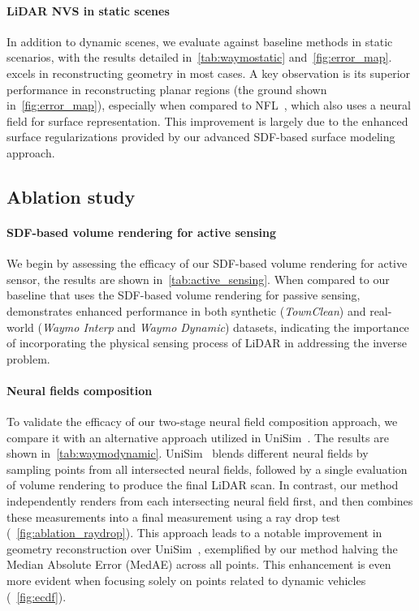 
\paragraph{LiDAR NVS in static scenes}
In addition to dynamic scenes, we evaluate \dynfl against baseline methods in static scenarios, with the results detailed in~\cref{tab:waymostatic} and~\cref{fig:error_map}. \dynfl excels in reconstructing geometry in most cases. A key observation is its superior performance in reconstructing planar regions (\eg the ground shown in~\cref{fig:error_map}), especially when compared to NFL~\cite{Huang2023nfl}, which also uses a neural field for surface representation. This improvement is largely due to the enhanced surface regularizations provided by our advanced SDF-based surface modeling approach.













\subsection{Ablation study}
\paragraph{SDF-based volume rendering for active sensing}
We begin by assessing the efficacy of our SDF-based volume rendering for active sensor, the results are shown in~\cref{tab:active_sensing}. When compared to our baseline that uses the SDF-based volume rendering for passive sensing, \dynfl demonstrates enhanced performance in both synthetic (\textit{TownClean}) and real-world (\textit{Waymo Interp} and \textit{Waymo Dynamic}) datasets, indicating the importance of incorporating the physical sensing process of LiDAR in addressing the inverse problem.


\paragraph{Neural fields composition} 
To validate the efficacy of our two-stage neural field composition approach, we compare it with an alternative approach utilized in UniSim~\cite{yang2023unisim}. The results are shown in~\cref{tab:waymodynamic}. UniSim~\cite{yang2023unisim} blends different neural fields by sampling points from all intersected neural fields, followed by a single evaluation of volume rendering to produce the final LiDAR scan. In contrast, our method independently renders from each intersecting neural field first, and then combines these measurements into a final measurement using a ray drop test (\cf~\cref{fig:ablation_raydrop}). This approach leads to a notable improvement in geometry reconstruction over UniSim~\cite{yang2023unisim}, exemplified by our method halving the Median Absolute Error (MedAE) across all points. This enhancement is even more evident when focusing solely on points related to dynamic vehicles (\cf~\cref{fig:ecdf}).
% 


